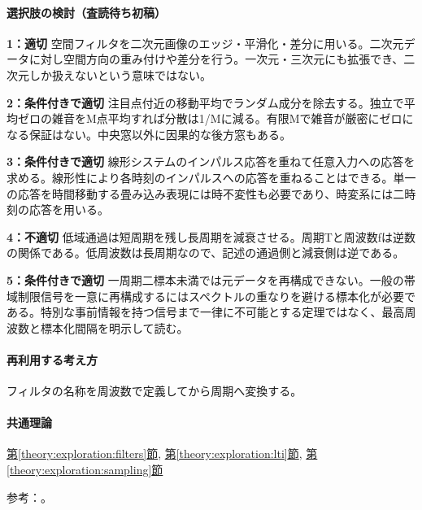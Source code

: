 \paragraph{選択肢の検討（査読待ち初稿）}\mbox{}\par

\noindent\textbf{1：適切} 空間フィルタを二次元画像のエッジ・平滑化・差分に用いる。二次元データに対し空間方向の重み付けや差分を行う。一次元・三次元にも拡張でき、二次元しか扱えないという意味ではない。\par

\noindent\textbf{2：条件付きで適切} 注目点付近の移動平均でランダム成分を除去する。独立で平均ゼロの雑音をM点平均すれば分散は1/Mに減る。有限Mで雑音が厳密にゼロになる保証はない。中央窓以外に因果的な後方窓もある。\par

\noindent\textbf{3：条件付きで適切} 線形システムのインパルス応答を重ねて任意入力への応答を求める。線形性により各時刻のインパルスへの応答を重ねることはできる。単一の応答を時間移動する畳み込み表現には時不変性も必要であり、時変系には二時刻の応答を用いる。\par

\noindent\textbf{4：不適切} 低域通過は短周期を残し長周期を減衰させる。周期Tと周波数fは逆数の関係である。低周波数は長周期なので、記述の通過側と減衰側は逆である。\par

\noindent\textbf{5：条件付きで適切} 一周期二標本未満では元データを再構成できない。一般の帯域制限信号を一意に再構成するにはスペクトルの重なりを避ける標本化が必要である。特別な事前情報を持つ信号まで一律に不可能とする定理ではなく、最高周波数と標本化間隔を明示して読む。\par

\paragraph{再利用する考え方} フィルタの名称を周波数で定義してから周期へ変換する。

\paragraph{共通理論} \hyperref[theory:exploration:filters]{第\ref*{theory:exploration:filters}節}, \hyperref[theory:exploration:lti]{第\ref*{theory:exploration:lti}節}, \hyperref[theory:exploration:sampling]{第\ref*{theory:exploration:sampling}節}

\par 参考：\cite{mit_signals2010,mit_moving2012,scipy_notch,scipy_fft,usgs_processing2000}。

